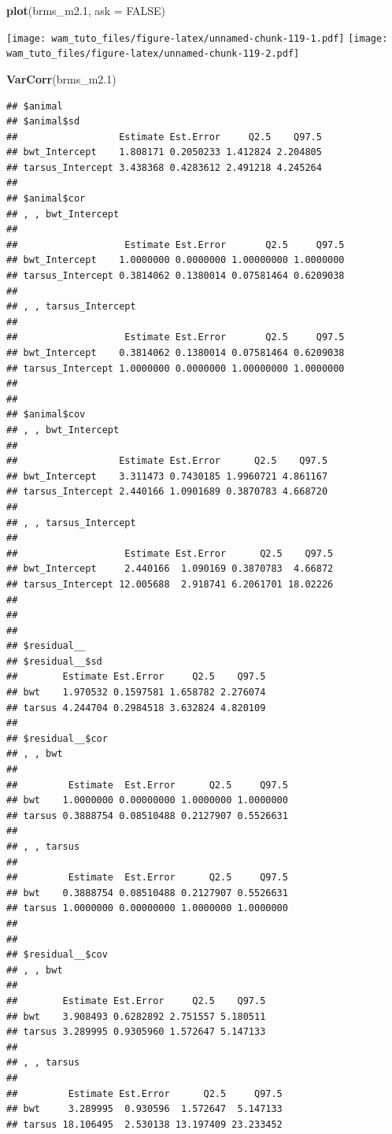 \documentclass[
  12pt,
]{book}
\newenvironment{Shaded}{\begin{snugshade}}{\end{snugshade}}
\newcommand{\DataTypeTok}[1]{\textcolor[rgb]{0.13,0.29,0.53}{#1}}
\newcommand{\FloatTok}[1]{\textcolor[rgb]{0.00,0.00,0.81}{#1}}
\newcommand{\KeywordTok}[1]{\textcolor[rgb]{0.13,0.29,0.53}{\textbf{#1}}}
\newcommand{\NormalTok}[1]{#1}
\newcommand{\OtherTok}[1]{\textcolor[rgb]{0.56,0.35,0.01}{#1}}
\begin{document}
\begin{Shaded}
\begin{Highlighting}[]
\KeywordTok{plot}\NormalTok{(brms\_m2}\FloatTok{.1}\NormalTok{, }\DataTypeTok{ask =} \OtherTok{FALSE}\NormalTok{)}
\end{Highlighting}
\end{Shaded}

\texttt{[image: wam\_tuto\_files/figure-latex/unnamed-chunk-119-1.pdf]} \texttt{[image: wam\_tuto\_files/figure-latex/unnamed-chunk-119-2.pdf]}

\begin{Shaded}
\begin{Highlighting}[]
\KeywordTok{VarCorr}\NormalTok{(brms\_m2}\FloatTok{.1}\NormalTok{)}
\end{Highlighting}
\end{Shaded}

\begin{verbatim}
## $animal
## $animal$sd
##                  Estimate Est.Error     Q2.5    Q97.5
## bwt_Intercept    1.808171 0.2050233 1.412824 2.204805
## tarsus_Intercept 3.438368 0.4283612 2.491218 4.245264
## 
## $animal$cor
## , , bwt_Intercept
## 
##                   Estimate Est.Error       Q2.5     Q97.5
## bwt_Intercept    1.0000000 0.0000000 1.00000000 1.0000000
## tarsus_Intercept 0.3814062 0.1380014 0.07581464 0.6209038
## 
## , , tarsus_Intercept
## 
##                   Estimate Est.Error       Q2.5     Q97.5
## bwt_Intercept    0.3814062 0.1380014 0.07581464 0.6209038
## tarsus_Intercept 1.0000000 0.0000000 1.00000000 1.0000000
## 
## 
## $animal$cov
## , , bwt_Intercept
## 
##                  Estimate Est.Error      Q2.5    Q97.5
## bwt_Intercept    3.311473 0.7430185 1.9960721 4.861167
## tarsus_Intercept 2.440166 1.0901689 0.3870783 4.668720
## 
## , , tarsus_Intercept
## 
##                   Estimate Est.Error      Q2.5    Q97.5
## bwt_Intercept     2.440166  1.090169 0.3870783  4.66872
## tarsus_Intercept 12.005688  2.918741 6.2061701 18.02226
## 
## 
## 
## $residual__
## $residual__$sd
##        Estimate Est.Error     Q2.5    Q97.5
## bwt    1.970532 0.1597581 1.658782 2.276074
## tarsus 4.244704 0.2984518 3.632824 4.820109
## 
## $residual__$cor
## , , bwt
## 
##         Estimate  Est.Error      Q2.5     Q97.5
## bwt    1.0000000 0.00000000 1.0000000 1.0000000
## tarsus 0.3888754 0.08510488 0.2127907 0.5526631
## 
## , , tarsus
## 
##         Estimate  Est.Error      Q2.5     Q97.5
## bwt    0.3888754 0.08510488 0.2127907 0.5526631
## tarsus 1.0000000 0.00000000 1.0000000 1.0000000
## 
## 
## $residual__$cov
## , , bwt
## 
##        Estimate Est.Error     Q2.5    Q97.5
## bwt    3.908493 0.6282892 2.751557 5.180511
## tarsus 3.289995 0.9305960 1.572647 5.147133
## 
## , , tarsus
## 
##         Estimate Est.Error      Q2.5     Q97.5
## bwt     3.289995  0.930596  1.572647  5.147133
## tarsus 18.106495  2.530138 13.197409 23.233452
\end{verbatim}
\end{document}
